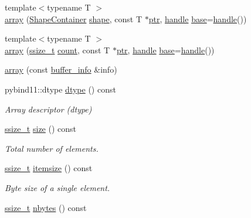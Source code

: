 \begin{DoxyCompactItemize}
\item 
{\footnotesize template$<$typename T $>$ }\\\mbox{\hyperlink{classarray_a29a0ed58b37adec393508a4eeed4236f}{array}} (\mbox{\hyperlink{classarray_a3378d7821106645fa3a88c5222e127e0}{Shape\+Container}} \mbox{\hyperlink{classarray_a084781a3d2cb3ea60ab7bcf16c30ee31}{shape}}, const T $\ast$\mbox{\hyperlink{classhandle_afcd412ba4cbffd7d1e3c9338746b2682}{ptr}}, \mbox{\hyperlink{classhandle}{handle}} \mbox{\hyperlink{structbase}{base}}=\mbox{\hyperlink{classhandle}{handle}}())
\item 
{\footnotesize template$<$typename T $>$ }\\\mbox{\hyperlink{classarray_a3fab95f1c066b62deaf8717fb3e99519}{array}} (\mbox{\hyperlink{detail_2common_8h_ac430d16fc097b3bf0a7469cfd09decda}{ssize\+\_\+t}} \mbox{\hyperlink{_s_d_l__opengl_8h_a619bc20e8198de3bd3f3d7fc34de66b2}{count}}, const T $\ast$\mbox{\hyperlink{classhandle_afcd412ba4cbffd7d1e3c9338746b2682}{ptr}}, \mbox{\hyperlink{classhandle}{handle}} \mbox{\hyperlink{structbase}{base}}=\mbox{\hyperlink{classhandle}{handle}}())
\item 
\mbox{\hyperlink{classarray_afadb342ccfd398c0498ae62277d2a1a9}{array}} (const \mbox{\hyperlink{structbuffer__info}{buffer\+\_\+info}} \&info)
\item 
pybind11\+::dtype \mbox{\hyperlink{classarray_a49535f32396582e415a61f3aac9c78b3}{dtype}} () const
\begin{DoxyCompactList}\small\item\em Array descriptor (dtype) \end{DoxyCompactList}\item 
\mbox{\hyperlink{detail_2common_8h_ac430d16fc097b3bf0a7469cfd09decda}{ssize\+\_\+t}} \mbox{\hyperlink{classarray_a34ae467d17d30b99913e27c755403fef}{size}} () const
\begin{DoxyCompactList}\small\item\em Total number of elements. \end{DoxyCompactList}\item 
\mbox{\hyperlink{detail_2common_8h_ac430d16fc097b3bf0a7469cfd09decda}{ssize\+\_\+t}} \mbox{\hyperlink{classarray_acd6aa4dba1e1db26fcfd21a323b4d4fa}{itemsize}} () const
\begin{DoxyCompactList}\small\item\em Byte size of a single element. \end{DoxyCompactList}\item 
\mbox{\hyperlink{detail_2common_8h_ac430d16fc097b3bf0a7469cfd09decda}{ssize\+\_\+t}} \mbox{\hyperlink{classarray_a0a2a16579bf2918347a8762c03f10137}{nbytes}} () const

\end{DoxyCompactItemize}
